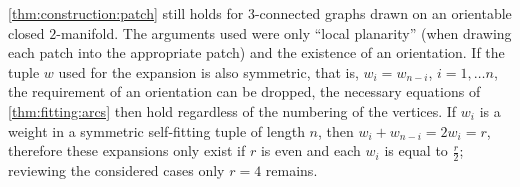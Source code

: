 \begin{remark}
  \autoref{thm:construction:patch} still holds for $3$-connected graphs drawn on an orientable closed $2$-manifold. The arguments used were only ``local planarity'' (when drawing each patch into the appropriate patch) and the existence of an orientation. If the tuple $w$ used for the expansion is also symmetric, that is, $w_i = w_{n-i}$, $i = 1, \dots n$, the requirement of an orientation can be dropped, the necessary equations of \autoref{thm:fitting:arcs} then hold regardless of the numbering of the vertices. If $w_i$ is a weight in a symmetric self-fitting tuple of length $n$, then $w_i + w_{n-i} = 2 w_i = r$, therefore these expansions only exist if $r$ is even and each $w_i$ is equal to $\frac{r}{2}$; reviewing the considered cases only $r = 4$ remains.
\end{remark}



